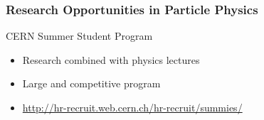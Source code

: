 \begin{frame}
 \frametitle{Research Opportunities in Particle Physics}
 \begin{block}{CERN Summer Student Program}
  \begin{itemize}
   \item Research combined with physics lectures
   \item Large and competitive program
   \item {\small \url{http://hr-recruit.web.cern.ch/hr-recruit/summies/}}
  \end{itemize}
 \end{block}
 \begin{center}
 \end{center}
\end{frame}

